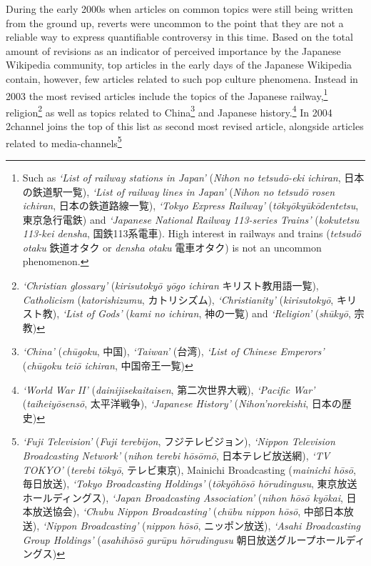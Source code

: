 \documentclass[10pt,british,A4paper,twoside]{memoir}
\begin{document}
During the early 2000s when articles on common topics were still being
written from the ground up, reverts were uncommon to the point that they
are not a reliable way to express quantifiable controversy in this time.
Based on the total amount of revisions as an indicator of perceived
importance by the Japanese Wikipedia community, top articles in the
early days of the Japanese Wikipedia contain, however, few articles
related to such pop culture phenomena. Instead in 2003 the most revised
articles include the topics of the Japanese railway,\footnote{Such as
  \emph{`List of railway stations in Japan'} (\emph{Nihon no tetsudō-eki
  ichiran}, 日本の鉄道駅一覧), \emph{`List of railway lines in Japan'}
  (\emph{Nihon no tetsudō rosen ichiran}, 日本の鉄道路線一覧),
  \emph{`Tokyo Express Railway'} (\emph{tōkyōkyūkōdentetsu},
  東京急行電鉄) and \emph{`Japanese National Railway 113-series Trains'}
  (\emph{kokutetsu 113-kei densha}, 国鉄113系電車). High interest in
  railways and trains (\emph{tetsudō otaku} 鉄道オタク or \emph{densha
  otaku} 電車オタク) is not an uncommon phenomenon.} religion\footnote{\emph{`Christian
  glossary'} (\emph{kirisutokyō yōgo ichiran} キリスト教用語一覧),
  \emph{Catholicism} (\emph{katorishizumu}, カトリシズム),
  \emph{`Christianity'} (\emph{kirisutokyō}, キリスト教), \emph{`List of
  Gods'} (\emph{kami no ichiran}, 神の一覧) and \emph{`Religion'}
  (\emph{shūkyō}, 宗教)} as well as topics related to China\footnote{\emph{`China'}
  (\emph{chūgoku}, 中国), \emph{`Taiwan'} (台湾), \emph{`List of Chinese
  Emperors' } (\emph{chūgoku teiō ichiran}, 中国帝王一覧)} and Japanese
history.\footnote{\emph{`World War II'} (\emph{dainijisekaitaisen},
  第二次世界大戦), \emph{`Pacific War'} (\emph{taiheiyōsensō},
  太平洋戦争), \emph{`Japanese History'} (\emph{Nihon'norekishi},
  日本の歴史)} In 2004 2channel joins the top of this list as second
most revised article, alongside articles related to
media-channels\footnote{\emph{`Fuji Television'} (\emph{Fuji terebijon},
  フジテレビジョン), \emph{`Nippon Television Broadcasting Network'}
  (\emph{nihon terebi hōsōmō}, 日本テレビ放送網), \emph{`TV TOKYO'}
  (\emph{terebi tōkyō}, テレビ東京), Mainichi Broadcasting
  (\emph{mainichi hōsō}, 毎日放送), \emph{`Tokyo Broadcasting Holdings'}
  (\emph{tōkyōhōsō hōrudingusu}, 東京放送ホールディングス), \emph{`Japan
  Broadcasting Association'} (\emph{nihon hōsō kyōkai}, 日本放送協会),
  \emph{`Chubu Nippon Broadcasting'} (\emph{chūbu nippon hōsō},
  中部日本放送), \emph{`Nippon Broadcasting'} (\emph{nippon hōsō},
  ニッポン放送), \emph{`Asahi Broadcasting Group Holdings'}
  (\emph{asahihōsō gurūpu hōrudingusu} 朝日放送グループホールディングス)}
\end{document}

